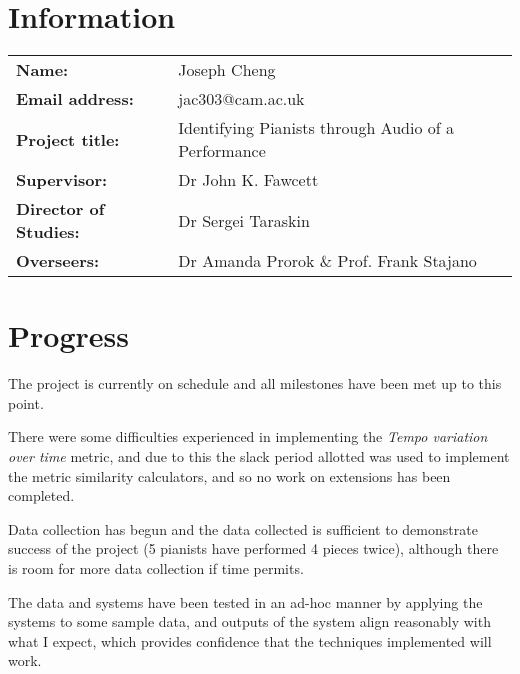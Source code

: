 \documentclass{article}
\begin{document}
\section*{Information}

\begin{tabular}{ll}
    
  \textbf{Name: }&Joseph Cheng \\

  \textbf{Email address: }&jac303@cam.ac.uk \\

  \textbf{Project title: }&Identifying Pianists through Audio of a Performance \\

  \textbf{Supervisor: }&Dr John K. Fawcett \\

  \textbf{Director of Studies: }&Dr Sergei Taraskin \\

  \textbf{Overseers: }&Dr Amanda Prorok \& Prof. Frank Stajano
\end{tabular}

\section*{Progress}

The project is currently on schedule and all milestones have been met up to this point.

There were some difficulties experienced in implementing the \textit{Tempo variation over time} metric, and due to this the slack period allotted was used to implement the metric similarity calculators, and so no work on extensions has been completed.

Data collection has begun and the data collected is sufficient to demonstrate success of the project (5 pianists have performed 4 pieces twice), although there is room for more data collection if time permits.

The data and systems have been tested in an ad-hoc manner by applying the systems to some sample data, and outputs of the system align reasonably with what I expect, which provides confidence that the techniques implemented will work.
\end{document}
